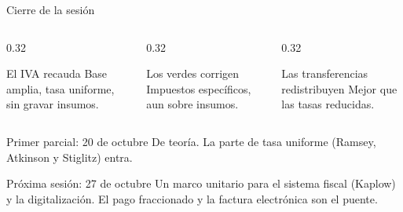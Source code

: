 \documentclass[aspectratio=169,11pt]{beamer}
\begin{document}
\begin{frame}{Cierre de la sesión}
  \begin{columns}[T]
    \begin{column}{0.32\textwidth}
      \begin{block}{El IVA recauda}
        Base amplia, tasa uniforme, sin gravar insumos.
      \end{block}
    \end{column}
    \begin{column}{0.32\textwidth}
      \begin{block}{Los verdes corrigen}
        Impuestos específicos, aun sobre insumos.
      \end{block}
    \end{column}
    \begin{column}{0.32\textwidth}
      \begin{block}{Las transferencias redistribuyen}
        Mejor que las tasas reducidas.
      \end{block}
    \end{column}
  \end{columns}
  \vspace{1em}
  \begin{alertblock}{Primer parcial: 20 de octubre}
    De teoría. La parte de tasa uniforme (Ramsey, Atkinson y Stiglitz) entra.
  \end{alertblock}
  \begin{block}{Próxima sesión: 27 de octubre}
    Un marco unitario para el sistema fiscal (Kaplow) y la digitalización. El pago fraccionado y la factura electrónica son el puente.
  \end{block}
\end{frame}
\end{document}
